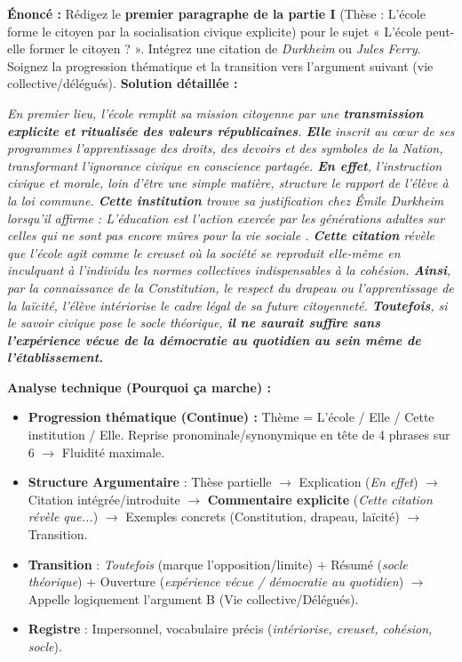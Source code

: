 \documentclass[11pt]{article}
\newcommand{\cle}[1]{{\popxbold\color{popdark}#1}}
\begin{document}
\begin{exoresolu}
    \textbf{Énoncé :} Rédigez le \textbf{premier paragraphe de la partie I} (Thèse : L'école forme le citoyen par la socialisation civique explicite) pour le sujet « L'école peut-elle former le citoyen ? ». Intégrez une citation de \emph{Durkheim} ou \emph{Jules Ferry}. Soignez la progression thématique et la transition vers l'argument suivant (vie collective/délégués).
    \tcblower
    \textbf{Solution détaillée :}
    
    \emph{En premier lieu, l'école remplit sa mission citoyenne par une \textbf{transmission explicite et ritualisée des valeurs républicaines}. \textbf{Elle} inscrit au cœur de ses programmes l'apprentissage des droits, des devoirs et des symboles de la Nation, transformant l'ignorance civique en conscience partagée. \textbf{En effet}, l'instruction civique et morale, loin d'être une simple matière, structure le rapport de l'élève à la loi commune. \textbf{Cette institution} trouve sa justification chez Émile Durkheim lorsqu'il affirme : \og L'éducation est l'action exercée par les générations adultes sur celles qui ne sont pas encore mûres pour la vie sociale \fg{}. \textbf{Cette citation} révèle que l'école agit comme le creuset où la société se reproduit elle-même en inculquant à l'individu les normes collectives indispensables à la cohésion. \textbf{Ainsi}, par la connaissance de la Constitution, le respect du drapeau ou l'apprentissage de la laïcité, l'élève intériorise le cadre légal de sa future citoyenneté. \textbf{Toutefois}, si le savoir civique pose le socle théorique, \textbf{il ne saurait suffire sans l'expérience vécue de la démocratie au quotidien au sein même de l'établissement.} }
    
    \textbf{Analyse technique (Pourquoi ça marche) :}
    \begin{itemize}
        \item \textbf{Progression thématique (Continue) :} Thème = \cle{L'école / Elle / Cette institution / Elle}. Reprise pronominale/synonymique en tête de 4 phrases sur 6 $\rightarrow$ Fluidité maximale.
        \item \textbf{Structure Argumentaire} : Thèse partielle $\rightarrow$ Explication (\emph{En effet}) $\rightarrow$ Citation intégrée/introduite $\rightarrow$ \textbf{Commentaire explicite} (\emph{Cette citation révèle que...}) $\rightarrow$ Exemples concrets (Constitution, drapeau, laïcité) $\rightarrow$ Transition.
        \item \textbf{Transition} : \emph{Toutefois} (marque l'opposition/limite) + Résumé (\emph{socle théorique}) + Ouverture (\emph{expérience vécue / démocratie au quotidien}) $\rightarrow$ Appelle logiquement l'argument B (Vie collective/Délégués).
        \item \textbf{Registre} : Impersonnel, vocabulaire précis (\emph{intériorise, creuset, cohésion, socle}).
    \end{itemize}
\end{exoresolu}
\end{document}
